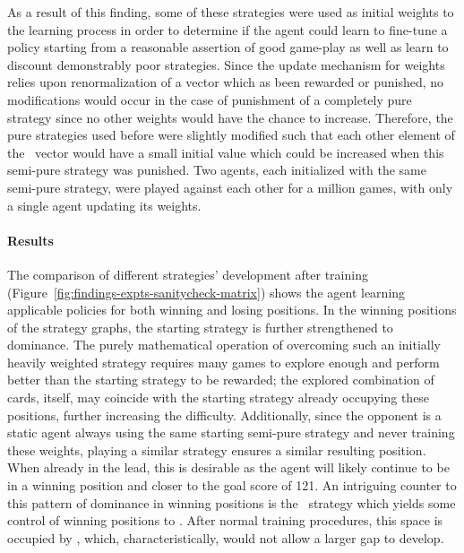 As a result of this finding,
some of these strategies were used as initial weights to the learning process
in order to determine if the agent could learn to fine-tune a policy starting
from a reasonable assertion of good game-play
as well as learn to discount demonstrably poor strategies.
%
Since the update mechanism for weights relies upon renormalization of a vector
which as been rewarded or punished,
no modifications would occur in the case of punishment of a completely pure strategy
since no other weights would have the chance to increase.
%
Therefore,
the pure strategies used before were slightly modified
such that each other
element of the \wvec\ vector would have a small initial value which could be
increased when this semi-pure strategy was punished.
%
Two agents,
each initialized with the same semi-pure strategy,
were played against each other for a million games,
with only a single agent updating its weights.




\paragraph*{Results}


The comparison of different strategies' development after training
(Figure~\ref{fig:findings-expts-sanitycheck-matrix})
shows the agent learning applicable policies
for both winning and losing positions.
%
In the winning positions of the strategy graphs,
the starting strategy is further strengthened to dominance.
%
The purely mathematical operation of overcoming such an initially heavily
weighted strategy requires many games to explore enough
and perform better than the starting strategy
to be rewarded;
%
the explored combination of cards, itself,
may coincide with the starting strategy
already occupying these positions,
further increasing the difficulty.
%
Additionally,
since the opponent is a static agent always using the same starting
semi-pure strategy and never training these weights,
playing a similar strategy ensures a similar resulting position.
%
When already in the lead,
this is desirable as the agent will likely continue to be in a winning position
and closer to the goal score of 121.
%
An intriguing counter to this pattern of dominance in winning positions
is the \handmaxavg\ strategy
which yields some control of winning positions to \handmaxmed.
%
After normal training procedures,
this space is occupied by \handmaxmin,
which, characteristically, would not allow a larger gap to develop.

